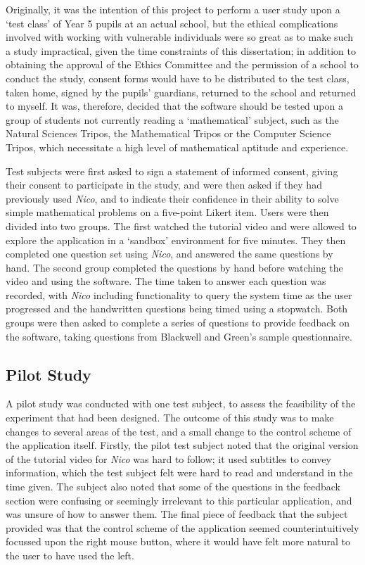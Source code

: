 \documentclass[12pt,twoside,notitlepage,xetex]{report}
\begin{document}
Originally, it was the intention of this project to perform a user study upon
a `test class' of Year 5 pupils at an actual school, but the ethical
complications involved with working with vulnerable individuals were so great
as to make such a study impractical, given the time constraints of this
dissertation; in addition to obtaining the approval of the Ethics Committee and
the permission of a school to conduct the study, consent forms would have to be
distributed to the test class, taken home, signed by the pupils' guardians,
returned to the school and returned to myself.  It was, therefore, decided that
the software should be tested upon a group of students not currently reading a
`mathematical' subject, such as the Natural Sciences Tripos, the Mathematical
Tripos or the Computer Science Tripos, which necessitate a high level of
mathematical aptitude and experience.

Test subjects were first asked to sign a statement of informed consent, giving
their consent to participate in the study, and were then asked if they had
previously used \emph{Nico}, and to indicate their confidence in their ability
to solve simple mathematical problems on a five-point Likert item.  Users were
then divided into two groups.  The first watched the tutorial video and were
allowed to explore the application in a `sandbox' environment for five
minutes.  They then completed one question set using \emph{Nico}, and answered
the same questions by hand.  The second group completed the questions by hand
before watching the video and using the software.  The time taken to answer
each question was recorded, with \emph{Nico} including functionality to query
the system time as the user progressed and the handwritten questions being
timed using a stopwatch.  Both groups were then asked to complete a series of
questions to provide feedback on the software, taking questions from Blackwell
and Green's sample questionnaire. \cite{Blackwell2000}

\subsection{Pilot Study}

A pilot study was conducted with one test subject, to assess the feasibility of
the experiment that had been designed.  The outcome of this study was to make
changes to several areas of the test, and a small change to the control scheme
of the application itself.  Firstly, the pilot test subject noted that the
original version of the tutorial video for \emph{Nico} was hard to follow; it
used subtitles to convey information, which the test subject felt were hard to
read and understand in the time given.  The subject also noted that some of the
questions in the feedback section were confusing or seemingly irrelevant to
this particular application, and was unsure of how to answer them.  The final
piece of feedback that the subject provided was that the control scheme of the
application seemed counterintuitively focussed upon the right mouse button,
where it would have felt more natural to the user to have used the left.
\end{document}
